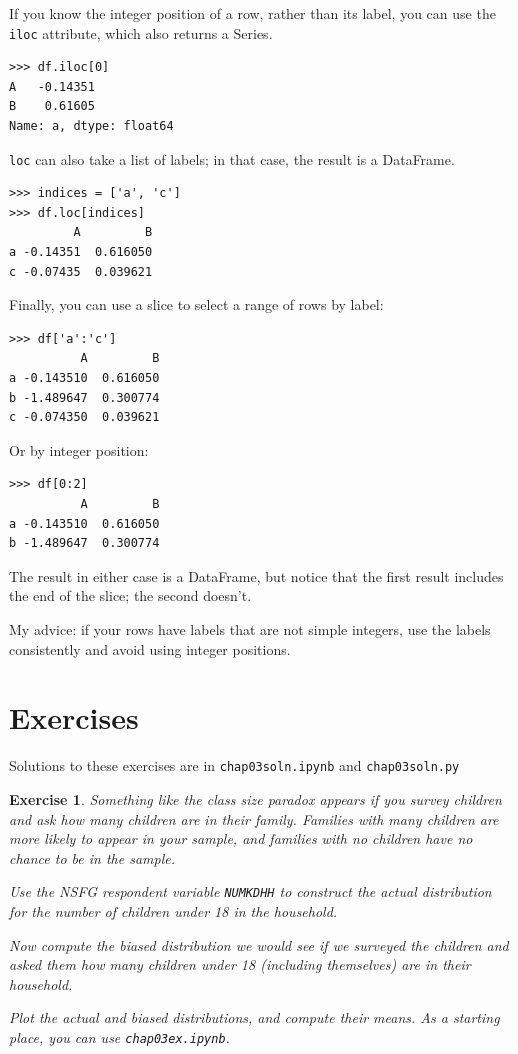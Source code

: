 \documentclass[12pt]{book}
\theoremstyle{exercise}
\newtheorem{exercise}{Exercise}[chapter]
\begin{document}
If you know the integer position of a row, rather than its label, you
can use the {\tt iloc} attribute, which also returns a Series.

\begin{verbatim}
>>> df.iloc[0]
A   -0.14351
B    0.61605
Name: a, dtype: float64
\end{verbatim}

{\tt loc} can also take a list of labels; in that case,
the result is a DataFrame.

\begin{verbatim}
>>> indices = ['a', 'c']
>>> df.loc[indices]
         A         B
a -0.14351  0.616050
c -0.07435  0.039621
\end{verbatim}

Finally, you can use a slice to select a range of rows by label:

\begin{verbatim}
>>> df['a':'c']
          A         B
a -0.143510  0.616050
b -1.489647  0.300774
c -0.074350  0.039621
\end{verbatim}

Or by integer position:

\begin{verbatim}
>>> df[0:2]
          A         B
a -0.143510  0.616050
b -1.489647  0.300774
\end{verbatim}

The result in either case is a DataFrame, but notice that the first
result includes the end of the slice; the second doesn't.%

My advice: if your rows have labels that are not simple integers, use
the labels consistently and avoid using integer positions.



\section{Exercises}

Solutions to these exercises are in \verb"chap03soln.ipynb"
and \verb"chap03soln.py"

\begin{exercise}
Something like the class size paradox appears if you survey children
and ask how many children are in their family.  Families with many
children are more likely to appear in your sample, and
families with no children have no chance to be in the sample.%
%

Use the NSFG respondent variable \verb"NUMKDHH" to construct the actual
distribution for the number of children under 18 in the household.

Now compute the biased distribution we would see if we surveyed the
children and asked them how many children under 18 (including themselves)
are in their household.  

Plot the actual and biased distributions, and compute their means.
As a starting place, you can use \verb"chap03ex.ipynb".
\end{exercise}
\end{document}

